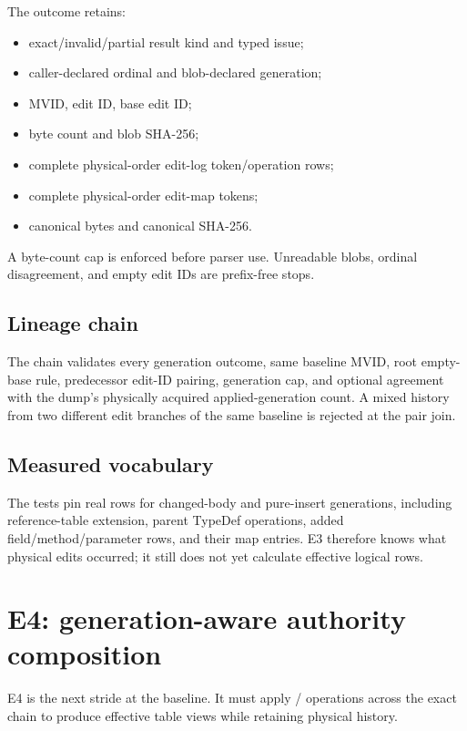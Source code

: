 \documentclass[11pt,oneside,openany]{book}
\newcommand{\typeName}[1]{\texttt{\detokenize{#1}}}
\begin{document}
The outcome retains:

\begin{itemize}
  \item exact/invalid/partial result kind and typed issue;
  \item caller-declared ordinal and blob-declared generation;
  \item MVID, edit ID, base edit ID;
  \item byte count and blob SHA-256;
  \item complete physical-order edit-log token/operation rows;
  \item complete physical-order edit-map tokens;
  \item canonical bytes and canonical SHA-256.
\end{itemize}

A byte-count cap is enforced before parser use. Unreadable blobs, ordinal disagreement, and empty edit IDs are prefix-free stops.

\subsection{Lineage chain}

The chain validates every generation outcome, same baseline MVID, root empty-base rule, predecessor edit-ID pairing, generation cap, and optional agreement with the dump's physically acquired applied-generation count. A mixed history from two different edit branches of the same baseline is rejected at the pair join.

\subsection{Measured vocabulary}

The tests pin real \typeName{EmitDifference} rows for changed-body and pure-insert generations, including reference-table extension, parent TypeDef operations, added field/method/parameter rows, and their map entries. E3 therefore knows what physical edits occurred; it still does not yet calculate effective logical rows.

\section{E4: generation-aware authority composition}

E4 is the next stride at the baseline. It must apply \typeName{EncLog}/\typeName{EncMap} operations across the exact chain to produce effective table views while retaining physical history.
\end{document}
